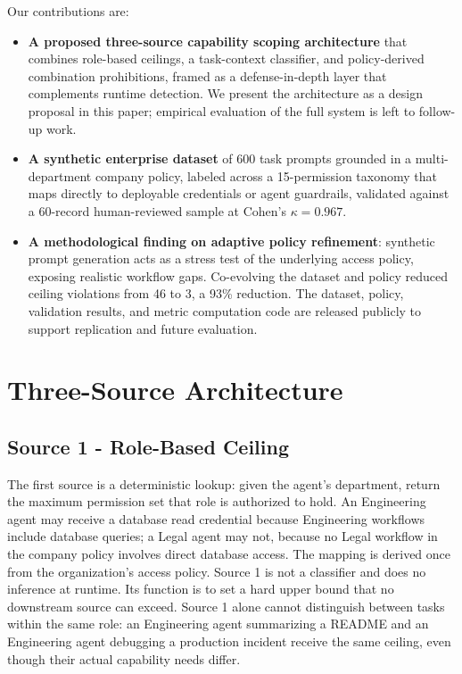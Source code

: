 \documentclass{article}
\theoremstyle{plain}
\theoremstyle{definition}
\theoremstyle{remark}
\begin{document}
Our contributions are:
\begin{itemize}
  \item \textbf{A proposed three-source capability scoping architecture} that combines role-based ceilings, a task-context classifier, and policy-derived combination prohibitions, framed as a defense-in-depth layer that complements runtime detection. We present the architecture as a design proposal in this paper; empirical evaluation of the full system is left to follow-up work.
  \item \textbf{A synthetic enterprise dataset} of 600 task prompts grounded in a multi-department company policy, labeled across a 15-permission taxonomy that maps directly to deployable credentials or agent guardrails, validated against a 60-record human-reviewed sample at Cohen's $\kappa = 0.967$.
  \item \textbf{A methodological finding on adaptive policy refinement}: synthetic prompt generation acts as a stress test of the underlying access policy, exposing realistic workflow gaps. Co-evolving the dataset and policy reduced ceiling violations from 46 to 3, a 93\% reduction. The dataset, policy, validation results, and metric computation code are released publicly to support replication and future evaluation.
\end{itemize}

\section{Three-Source Architecture}
\subsection{Source 1 - Role-Based Ceiling}
The first source is a deterministic lookup: given the agent's department, 
return the maximum permission set that role is authorized to hold. An 
Engineering agent may receive a database read credential because Engineering 
workflows include database queries; a Legal agent may not, because no Legal 
workflow in the company policy involves direct database access. The mapping 
is derived once from the organization's access policy. Source 1 is not a 
classifier and does no inference at runtime. Its function is to set a hard 
upper bound that no downstream source can exceed. Source 1 alone cannot 
distinguish between tasks within the same role: an Engineering agent 
summarizing a README and an Engineering agent debugging a production 
incident receive the same ceiling, even though their actual capability 
needs differ.
\end{document}
